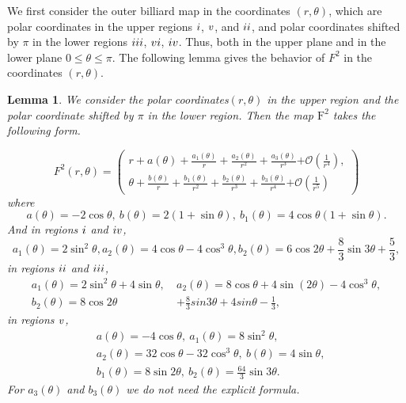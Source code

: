 \documentclass{article}
\numberwithin{figure}{section}
\numberwithin{equation}{section}
\newtheorem{lemma}{Lemma}
\theoremstyle{remark}
\theoremstyle{definition}
\begin{document}
We first consider the outer billiard map in the coordinates \((r,\theta)\), 
which are polar coordinates in the upper regions $\uppercase\expandafter{\romannumeral1}$, $\uppercase\expandafter{\romannumeral5}$, and
$\uppercase\expandafter{\romannumeral2}$, and polar coordinates shifted by \(\pi\) in the lower regions
$\uppercase\expandafter{\romannumeral3}$, $\uppercase\expandafter{\romannumeral6}$, $\uppercase\expandafter{\romannumeral4}$. Thus, both in the upper plane and in the lower plane $0\leq\theta\leq\pi$.
The following lemma gives the behavior of $F^2$ in the coordinates $(r,\theta)$.

\begin{lemma}\label{r-theta expansion}
	We consider the polar coordinates\((r,\theta)\) in the upper region and the polar coordinate
shifted by \(\pi\) in the lower region. Then the map
	\(\text{F}^{\text{2}}\) takes the following form.
	
	\begin{equation}\label{map_F^2}
		F^{2}(r,\theta) = \left( \begin{array}{r}
			r + a(\theta) + \frac{a_{1}(\theta)}{r} + \frac{a_{2}(\theta)}{r^{2}}+\frac{a_3(\theta)}{r^3}\mathcal{+ O}\left( \frac{1}{r^{4}} \right), \\
			\theta + \frac{b(\theta)}{r} + \frac{b_{1}(\theta)}{r^{2}} + \frac{b_{2}(\theta)}{r^{3}}+\frac{b_3(\theta)}{r^4}\mathcal{+ O}\left( \frac{1}{r^{5}} \right)
		\end{array} \right)
	\end{equation}
	where
	\begin{equation*}
		a(\theta) = - 2\cos\theta,\ b(\theta) = 2\left( 1 + \sin\theta \right),\ b_{1}(\theta) = 4\cos{\theta\left( 1 + \sin\theta \right)}.
	\end{equation*}
	And in regions $\uppercase\expandafter{\romannumeral1}$ and $\uppercase\expandafter{\romannumeral4}$, 
	\begin{equation*}
		a_{1}(\theta) = 2\sin^{2}\theta, a_{2}(\theta) = 4\cos\theta - 4\cos^{3}\theta, b_{2}(\theta) = 6\cos{2\theta} + \frac{8}{3}\sin3\theta + \frac{5}{3},
	\end{equation*}
	in regions $\uppercase\expandafter{\romannumeral2}$ and $\uppercase\expandafter{\romannumeral3}$,
	\begin{align*}
		a_{1}(\theta) = 2\sin^{2}\theta + 4\sin\theta,\ & a_{2}(\theta) = 8\cos\theta + 4\sin(2\theta) - 4\cos^{3}\theta,\\
		b_{2}(\theta) = 8\cos{2\theta} &+ \frac{8}{3}sin3\theta + 4sin\theta - \frac{1}{3},
	\end{align*}
	in regions $\uppercase\expandafter{\romannumeral5}$,
	\begin{align*}
		&a(\theta) = - 4\cos\theta, \ a_{1}(\theta) = 8\sin^{2}\theta,\\
		&a_{2}(\theta) = 32\cos\theta - 32\cos^{3}\theta, \ b(\theta) = 4\sin\theta,\\ 
		&b_{1}(\theta) = 8\sin{2\theta}, \ b_{2}(\theta) = \frac{64}{3}\sin3\theta.
	\end{align*}
    For $a_3(\theta)$ and $b_3(\theta)$ we do not need the explicit formula.
\end{lemma}
\end{document}
